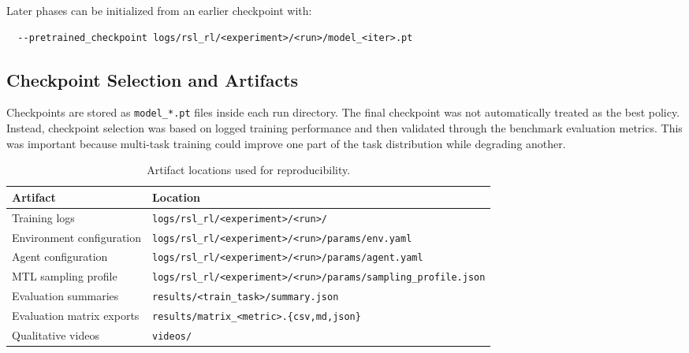 Later phases can be initialized from an earlier checkpoint with:
\begin{verbatim}
  --pretrained_checkpoint logs/rsl_rl/<experiment>/<run>/model_<iter>.pt
\end{verbatim}

\subsection{Checkpoint Selection and Artifacts}
\label{app:checkpoint-selection}

Checkpoints are stored as \texttt{model\_*.pt} files inside each run directory. The final checkpoint was not automatically treated as the best policy. Instead, checkpoint selection was based on logged training performance and then validated through the benchmark evaluation metrics. This was important because multi-task training could improve one part of the task distribution while degrading another.

\begin{table}[htbp]
\centering
\caption{Artifact locations used for reproducibility.}
\label{tab:learning-artifacts}
\begin{tabular}{ll}
\toprule
Artifact & Location \\
\midrule
Training logs & \texttt{logs/rsl\_rl/<experiment>/<run>/} \\
Environment configuration & \texttt{logs/rsl\_rl/<experiment>/<run>/params/env.yaml} \\
Agent configuration & \texttt{logs/rsl\_rl/<experiment>/<run>/params/agent.yaml} \\
MTL sampling profile & \texttt{logs/rsl\_rl/<experiment>/<run>/params/sampling\_profile.json} \\
Evaluation summaries & \texttt{results/<train\_task>/summary.json} \\
Evaluation matrix exports & \texttt{results/matrix\_<metric>.\{csv,md,json\}} \\
Qualitative videos & \texttt{videos/} \\
\bottomrule
\end{tabular}
\end{table}
